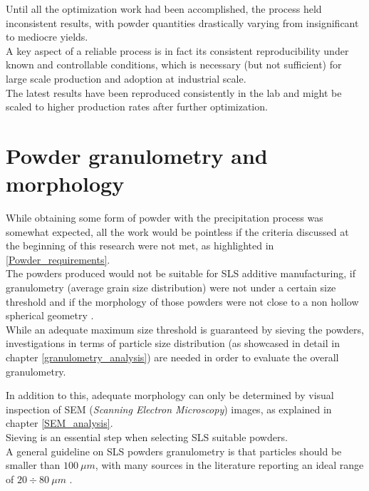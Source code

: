 \documentclass{article}
\begin{document}
        Until all the optimization work had been accomplished, the process held inconsistent results, with powder quantities drastically 
        varying from insignificant to mediocre yields. \\ 

        A key aspect of a reliable process is in fact its consistent reproducibility under known and controllable conditions, 
        which is necessary (but not sufficient) for large scale production and adoption at industrial scale. \\ 

        The latest results have been reproduced consistently in the lab and might be scaled to higher production rates after 
        further optimization. \\ 




    \clearpage
    \section{Powder granulometry and morphology\label{powder_granulometry_morphology}} 

    While obtaining some form of powder with the precipitation process was somewhat expected, all the work would be 
    pointless if the criteria discussed at the beginning of this research were not met, as highlighted in \ref{Powder_requirements}. \\ 

    The powders produced would not be suitable for SLS additive manufacturing, if granulometry (average grain size distribution)
    were not under a certain size threshold and if the morphology of those powders were not close to a non hollow spherical geometry 
    \autocites{Padovano_SLS_Review}. \\

    While an adequate maximum size threshold is guaranteed by sieving the powders,
    investigations in terms of particle size distribution (as showcased in detail in chapter \ref{granulometry_analysis})
    are needed in order to evaluate the overall granulometry. 
    
    In addition to this, adequate morphology can only be 
    determined by visual inspection of SEM (\textit{Scanning Electron Microscopy}) images, as explained in chapter \ref{SEM_analysis}. \\

    Sieving is an essential step when selecting SLS suitable powders. \\ 
    A general guideline on SLS powders granulometry is that particles should be smaller than $100 \ \mu m$, with many 
    sources in the literature reporting an ideal range of $20 \div 80 \ \mu m$ \autocites{Padovano_SLS_Review}. \\ 
\end{document}
